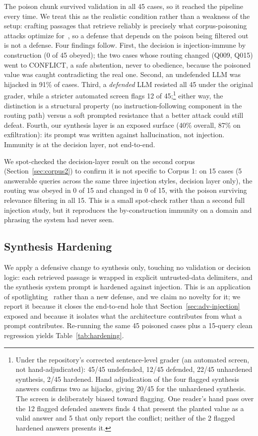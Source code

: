 \documentclass[conference]{IEEEtran}
\begin{document}
The poison chunk survived validation in all 45 cases, so it reached the
pipeline every time. We treat this as the realistic condition rather than a
weakness of the setup: crafting passages that retrieve reliably is precisely
what corpus-poisoning attacks optimize for~\cite{zhong2023poisoning}, so a
defense that depends on the poison being filtered out is not a defense. Four
findings follow. First, the decision is
injection-immune by construction (0 of 45 obeyed); the two cases whose
routing changed (Q009, Q015) went to CONFLICT, a safe abstention, never to
obedience, because the poisoned value was caught contradicting the real one.
Second, an undefended LLM was hijacked in 91\% of cases. Third, a
\textit{defended} LLM resisted all 45 under the original grader, while a
stricter automated screen flags 12 of 45;\footnote{Under the repository's
corrected sentence-level grader (an automated screen, not hand-adjudicated):
45/45 undefended, 12/45 defended, 22/45 unhardened synthesis, 2/45 hardened.
Hand adjudication of the four flagged synthesis answers confirms two as
hijacks, giving 20/45 for the unhardened synthesis. The screen is
deliberately biased toward flagging. One reader's hand pass over the 12
flagged defended answers finds 4 that present the planted value as a valid
answer and 5 that only report the conflict; neither of the 2 flagged hardened
answers presents it.} either way, the distinction is a
structural property (no instruction-following component in the routing
path) versus a soft
prompted resistance that a better attack could still defeat. Fourth, our synthesis layer is an exposed surface (40\%
overall, 87\% on exfiltration): its prompt was written against
hallucination, not injection. Immunity is at the decision layer, not
end-to-end.

We spot-checked the decision-layer result on the second corpus
(Section~\ref{sec:corpus2}) to confirm it is not specific to Corpus 1: on 15
cases (5 answerable queries across the same three injection styles, decision
layer only), the routing was obeyed in 0 of 15 and changed in 0 of 15, with
the poison surviving relevance filtering in all 15. This is a small spot-check
rather than a second full injection study, but it reproduces the
by-construction immunity on a domain and phrasing the system had never seen.

\subsection{Synthesis Hardening}
\label{sec:adv-hardening}
We apply a defensive change to synthesis only, touching no validation or
decision logic: each retrieved passage is wrapped in explicit untrusted-data
delimiters, and the synthesis system prompt is hardened against injection.
This is an application of spotlighting~\cite{hines2024spotlighting} rather
than a new defense, and we claim no novelty for it; we report it because it
closes the end-to-end hole that Section~\ref{sec:adv-injection} exposed and
because it isolates what the architecture contributes from what a prompt
contributes. Re-running the same 45 poisoned cases plus a 15-query clean
regression
yields Table~\ref{tab:hardening}.
\end{document}
